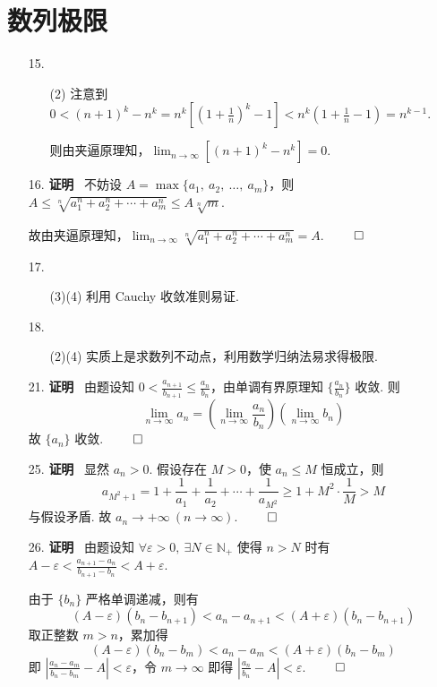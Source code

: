 \documentclass[11pt,oneside,fontset=fandol]{ctexbook} %
\begin{document}
\section{数列极限}

\begin{enumerate}
    \item[15.]
    \begin{enumerate}
        \item[(2)]
        注意到 $0 < (n+1)^k - n^k = n^k \left[(1 + \frac 1 n)^k - 1 \right] < n^k (1 + \frac 1 n - 1) = n^{k-1}$.
        
        则由夹逼原理知，$\lim_{n \to \infty} \left[(n+1)^k - n^k \right] = 0$.
    \end{enumerate}
    \item[16.]
    \textbf{证明} \ 不妨设 $A = \max\{ a_1,\ a_2,\ \ldots,\ a_m \}$，则 $A \leqslant \sqrt[n]{a_1^n+a_2^n+\cdots+a_m^n} \leqslant A \sqrt[n]{m}$.
    
    故由夹逼原理知，$\lim_{n \to \infty} \sqrt[n]{a_1^n+a_2^n+\cdots+a_m^n} = A$.
    $\hfill\qed$
    \item[17.]
    \begin{enumerate}
        \item[(3)(4)]
        利用 Cauchy 收敛准则易证.
    \end{enumerate}
    \item[18.]
    \begin{enumerate}
        \item[(2)(4)]
        实质上是求数列不动点，利用数学归纳法易求得极限.
    \end{enumerate}
    \item[21.]
    \textbf{证明} \ 由题设知 $0 < \frac{a_{n+1}}{b_{n+1}} \leqslant \frac{a_n}{b_n}$，由单调有界原理知 $\{ \frac{a_n}{b_n} \}$ 收敛. 则
    \[
        \lim_{n \to \infty} a_n = \left( \lim_{n \to \infty} \frac{a_n}{b_n} \right) \left(\lim_{n \to \infty} b_n \right)
    \]
    故 $\{ a_n \}$ 收敛.
    $\hfill\qed$
    \item[25.]
    \textbf{证明} \ 显然 $a_n > 0$. 假设存在 $M > 0$，使 $a_n \leqslant M$ 恒成立，则
    \[
        a_{M^2+1} = 1 + \frac 1 {a_1} + \frac 1 {a_2} + \cdots + \frac 1 {a_{M^2}} \geqslant 1 + M^2 \cdot \frac 1 M > M
    \]
    与假设矛盾. 故 $ a_n \to +\infty \ (n \to \infty)$.
    $\hfill\qed$
    \item[26.]
    \textbf{证明} \ 由题设知 $\forall \varepsilon>0,\ \exists N \in \mathbb N_+$ 使得 $n>N$ 时有 $A-\varepsilon < \frac{a_{n+1}-a_n}{b_{n+1}-b_n} < A+\varepsilon$.
    
    由于 $\{ b_n \}$ 严格单调递减，则有
    \[
        (A-\varepsilon)(b_n-b_{n+1}) < a_n - a_{n+1} < (A+\varepsilon)(b_n-b_{n+1})
    \]
    取正整数 $m > n$，累加得
    \[
        (A-\varepsilon)(b_n-b_m) < a_n - a_m < (A+\varepsilon)(b_n-b_m)
    \]
    即 $\left| \frac{a_n-a_m}{b_n-b_m} - A \right| < \varepsilon$，令 $m \to \infty$ 即得 $\left| \frac{a_n}{b_n} - A \right| < \varepsilon$.
    $\hfill\qed$
\end{enumerate}
\end{document}
